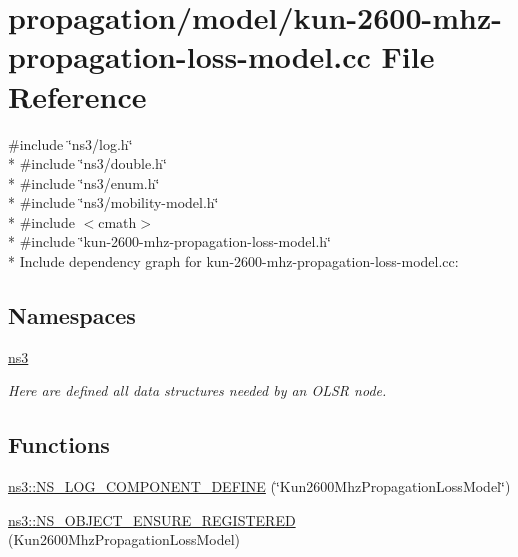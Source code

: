 \hypertarget{kun-2600-mhz-propagation-loss-model_8cc}{}\section{propagation/model/kun-\/2600-\/mhz-\/propagation-\/loss-\/model.cc File Reference}
\label{kun-2600-mhz-propagation-loss-model_8cc}
{\ttfamily \#include \char`\"{}ns3/log.\+h\char`\"{}}\\*
{\ttfamily \#include \char`\"{}ns3/double.\+h\char`\"{}}\\*
{\ttfamily \#include \char`\"{}ns3/enum.\+h\char`\"{}}\\*
{\ttfamily \#include \char`\"{}ns3/mobility-\/model.\+h\char`\"{}}\\*
{\ttfamily \#include $<$cmath$>$}\\*
{\ttfamily \#include \char`\"{}kun-\/2600-\/mhz-\/propagation-\/loss-\/model.\+h\char`\"{}}\\*
Include dependency graph for kun-\/2600-\/mhz-\/propagation-\/loss-\/model.cc\+:
\subsection*{Namespaces}
\begin{DoxyCompactItemize}
\item 
 \hyperlink{namespacens3}{ns3}
\begin{DoxyCompactList}\small\item\em Here are defined all data structures needed by an O\+L\+SR node. \end{DoxyCompactList}\end{DoxyCompactItemize}
\subsection*{Functions}
\begin{DoxyCompactItemize}
\item 
\hyperlink{namespacens3_ad7efdf470a9c7a1dff26ee15ad4dbaa6}{ns3\+::\+N\+S\+\_\+\+L\+O\+G\+\_\+\+C\+O\+M\+P\+O\+N\+E\+N\+T\+\_\+\+D\+E\+F\+I\+NE} (\char`\"{}Kun2600\+Mhz\+Propagation\+Loss\+Model\char`\"{})
\item 
\hyperlink{namespacens3_af04dcdba058d53e65959309ce3ef95a7}{ns3\+::\+N\+S\+\_\+\+O\+B\+J\+E\+C\+T\+\_\+\+E\+N\+S\+U\+R\+E\+\_\+\+R\+E\+G\+I\+S\+T\+E\+R\+ED} (Kun2600\+Mhz\+Propagation\+Loss\+Model)
\end{DoxyCompactItemize}
